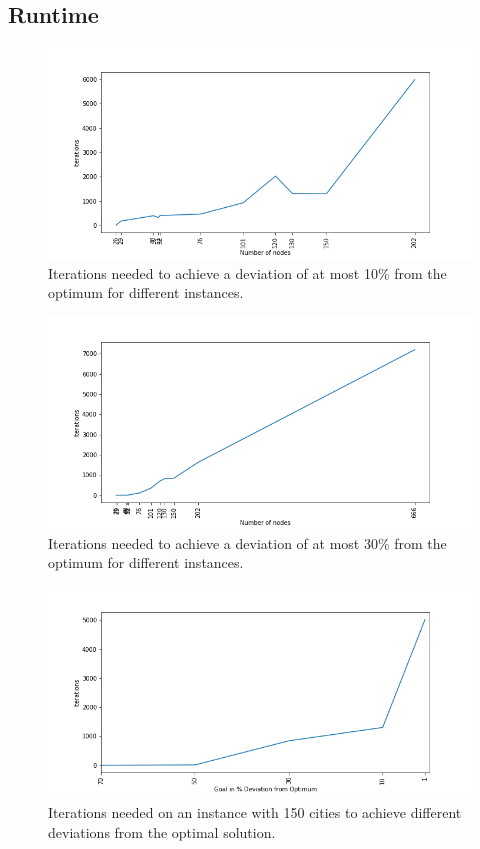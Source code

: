 \documentclass{article}
\begin{document}
\subsection{Runtime}

\begin{figure}[h]
  \center
  \includegraphics[width=0.7\paperwidth]{Goal_10.png}
  \caption{Iterations needed to achieve a deviation of at most 10\% from the optimum for different instances.}
  \label{fig:goal10}
\end{figure}

\begin{figure}[h]
  \center
  \includegraphics[width=0.7\paperwidth]{Goal_30.png}
  \caption{Iterations needed to achieve a deviation of at most 30\% from the optimum for different instances.}
  \label{fig:goal30}
\end{figure}

\begin{figure}[h]
  \center
  \includegraphics[width=0.7\paperwidth]{Nodes_150.png}
  \caption{Iterations needed on an instance with 150 cities to achieve different deviations from the optimal solution.}
  \label{fig:nodes150}
\end{figure}
\end{document}
